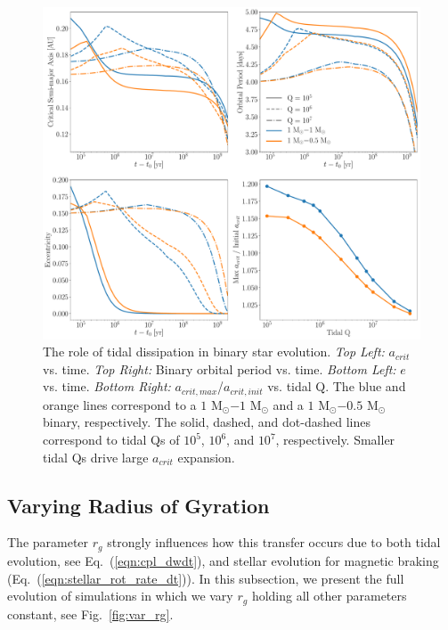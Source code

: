\begin{figure}
	\includegraphics[width=\columnwidth]{var_Q.pdf}
    \caption{The role of tidal dissipation in binary star evolution. {\it Top Left:} $a_{crit}$ vs. time.  {\it Top Right:} Binary orbital period vs. time. {\it Bottom Left:} $e$ vs. time. {\it Bottom Right:} $a_{crit,max}$/$a_{crit,init}$ vs. tidal Q.  The blue and orange lines correspond to a $1$ M$_{\odot}$$-1$ M$_{\odot}$ and a $1$ M$_{\odot}$$-0.5$ M$_{\odot}$ binary, respectively.  The solid, dashed, and dot-dashed lines correspond to tidal Qs of $10^5$, $10^6$, and $10^7$, respectively.  Smaller tidal Qs drive large $a_{crit}$ expansion.}
    \label{fig:var_Q}
\end{figure}

\subsection{Varying Radius of Gyration} \label{sec:var_rg}

The parameter $r_g$ strongly influences how this transfer occurs due to both tidal evolution, see Eq.~(\ref{eqn:cpl_dwdt}), and stellar evolution for magnetic braking (Eq.~(\ref{eqn:stellar_rot_rate_dt})).  In this subsection, we present the full evolution of simulations in which we vary $r_g$ holding all other parameters constant, see Fig.~\ref{fig:var_rg}.

